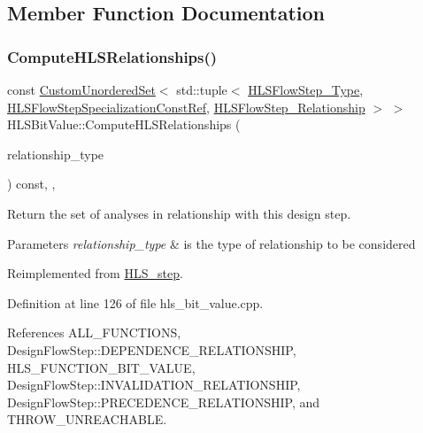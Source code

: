 \subsection{Member Function Documentation}
\mbox{\label{classHLSBitValue_ada9226f3cb7ef2e1f48d9268e440fa48}} 
\subsubsection{\texorpdfstring{Compute\+H\+L\+S\+Relationships()}{ComputeHLSRelationships()}}
{\footnotesize\ttfamily const \hyperlink{classCustomUnorderedSet}{Custom\+Unordered\+Set}$<$ std\+::tuple$<$ \hyperlink{hls__step_8hpp_ada16bc22905016180e26fc7e39537f8d}{H\+L\+S\+Flow\+Step\+\_\+\+Type}, \hyperlink{hls__step_8hpp_a5fdd2edf290c196531d21d68e13f0e74}{H\+L\+S\+Flow\+Step\+Specialization\+Const\+Ref}, \hyperlink{hls__step_8hpp_a3ad360b9b11e6bf0683d5562a0ceb169}{H\+L\+S\+Flow\+Step\+\_\+\+Relationship} $>$ $>$ H\+L\+S\+Bit\+Value\+::\+Compute\+H\+L\+S\+Relationships (\begin{DoxyParamCaption}\item[{const \hyperlink{classDesignFlowStep_a723a3baf19ff2ceb77bc13e099d0b1b7}{Design\+Flow\+Step\+::\+Relationship\+Type}}]{relationship\+\_\+type }\end{DoxyParamCaption}) const\hspace{0.3cm}{\ttfamily [override]}, {\ttfamily [private]}, {\ttfamily [virtual]}}



Return the set of analyses in relationship with this design step. 


\begin{DoxyParams}{Parameters}
{\em relationship\+\_\+type} & is the type of relationship to be considered \\
\hline
\end{DoxyParams}


Reimplemented from \hyperlink{classHLS__step_aed0ce8cca9a1ef18e705fc1032ad4de5}{H\+L\+S\+\_\+step}.



Definition at line 126 of file hls\+\_\+bit\+\_\+value.\+cpp.



References A\+L\+L\+\_\+\+F\+U\+N\+C\+T\+I\+O\+NS, Design\+Flow\+Step\+::\+D\+E\+P\+E\+N\+D\+E\+N\+C\+E\+\_\+\+R\+E\+L\+A\+T\+I\+O\+N\+S\+H\+IP, H\+L\+S\+\_\+\+F\+U\+N\+C\+T\+I\+O\+N\+\_\+\+B\+I\+T\+\_\+\+V\+A\+L\+UE, Design\+Flow\+Step\+::\+I\+N\+V\+A\+L\+I\+D\+A\+T\+I\+O\+N\+\_\+\+R\+E\+L\+A\+T\+I\+O\+N\+S\+H\+IP, Design\+Flow\+Step\+::\+P\+R\+E\+C\+E\+D\+E\+N\+C\+E\+\_\+\+R\+E\+L\+A\+T\+I\+O\+N\+S\+H\+IP, and T\+H\+R\+O\+W\+\_\+\+U\+N\+R\+E\+A\+C\+H\+A\+B\+LE.

